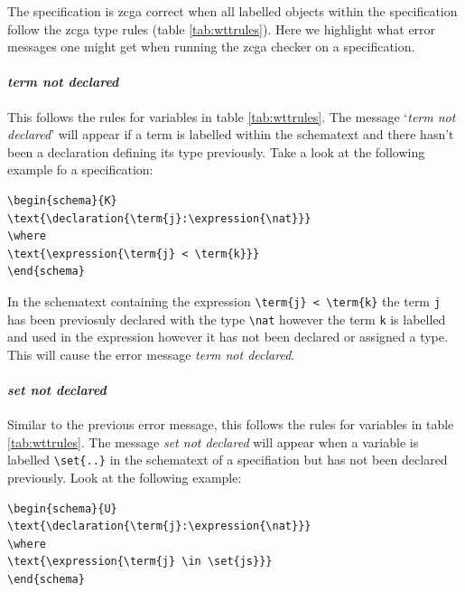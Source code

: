 The specification is \gls{zcga} correct when all labelled objects within the
specification follow the \gls{zcga} type rules (table \ref{tab:wttrules}). Here
we highlight what error messages one might get when running the \gls{zcga}
checker on a specification.


\paragraph{\emph{term not declared}}

This follows the rules for variables in table \ref{tab:wttrules}. The message
`\emph{term not declared}' will appear if a term is labelled within the
schematext and there hasn't been a declaration defining its type previously.
Take a look at the following example fo a specification:

\begin{exam}
\label{Kexam}
\begin{verbatim}
\begin{schema}{K}
\text{\declaration{\term{j}:\expression{\nat}}}
\where
\text{\expression{\term{j} < \term{k}}}
\end{schema}
\end{verbatim}
\end{exam}

In the schematext containing the expression \verb|\term{j} < \term{k}| the term
\verb|j| has been previosuly declared with the type \verb|\nat| however the term
\verb|k| is labelled and used in the expression however it has not been declared
or assigned a type. This will cause the error message \emph{term not declared}.

\paragraph{\emph{set not declared}}

Similar to the previous error message, this follows the rules for variables in
table \ref{tab:wttrules}. The message \emph{set not declared} will appear when a
variable is labelled \verb|\set{..}| in the schematext of a specifiation but has
not been declared previously. Look at the following example:

\begin{exam}
\begin{verbatim}       
\begin{schema}{U}
\text{\declaration{\term{j}:\expression{\nat}}}
\where
\text{\expression{\term{j} \in \set{js}}}
\end{schema}
\end{verbatim}
\end{exam}

